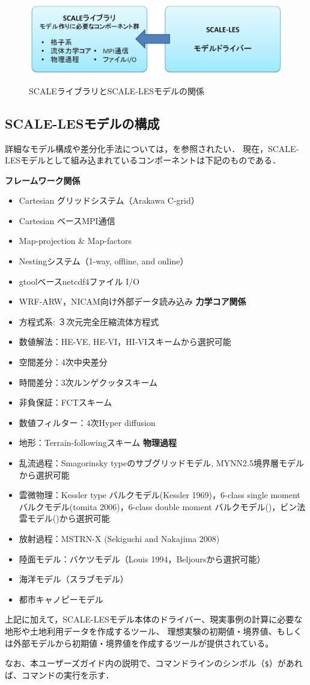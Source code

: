 \begin{figure}[t]
\begin{center}
  \includegraphics[width=0.9\hsize]{./figure/scale_and_scale-les.eps}\\
  \caption{SCALEライブラリとSCALE-LESモデルの関係}
  \label{fig:scale-les}
\end{center}
\end{figure}


\subsection{SCALE-LESモデルの構成}
詳細なモデル構成や差分化手法については，\cite{scale_2015}を参照されたい．
現在，SCALE-LESモデルとして組み込まれているコンポーネントは下記のものである．

{\bf フレームワーク関係}
\begin{itemize}
\item Cartesian グリッドシステム（Arakawa C-grid）
\item Cartesian ベースMPI通信
\item Map-projection \& Map-factors
\item Nestingシステム（1-way, offline, and online）
\item gtoolベースnetcdf4ファイル I/O
\item WRF-ARW，NICAM向け外部データ読み込み
{\bf 力学コア関係}
\item 方程式系: ３次元完全圧縮流体方程式
\item 数値解法：HE-VE,  HE-VI，HI-VIスキームから選択可能
\item 空間差分：4次中央差分
\item 時間差分：3次ルンゲクッタスキーム
\item 非負保証：FCTスキーム
\item 数値フィルター：4次Hyper diffusion
\item 地形：Terrain-followingスキーム
{\bf 物理過程}
\item 乱流過程：Smagorinsky typeのサブグリッドモデル, MYNN2.5境界層モデルから選択可能
\item 雲微物理：Kessler type バルクモデル(Kessler 1969)，6-class single moment バルクモデル(tomita 2006)，6-class double moment バルクモデル(\cite{sn_2014})，ビン法雲モデル(\cite{suzuki_etal_2010})から選択可能
\item 放射過程：MSTRN-X (Sekiguchi and Nakajima 2008)
\item 陸面モデル：バケツモデル（Louis 1994，Beljoursから選択可能）
\item 海洋モデル（スラブモデル）
\item 都市キャノピーモデル
\end{itemize}

上記に加えて，SCALE-LESモデル本体のドライバー、現実事例の計算に必要な地形や土地利用データを作成するツール、
理想実験の初期値・境界値、もしくは外部モデルから初期値・境界値を作成するツールが提供されている。

なお、本ユーザーズガイド内の説明で、コマンドラインのシンボル（\verb|$|）があれば、コマンドの実行を示す．
